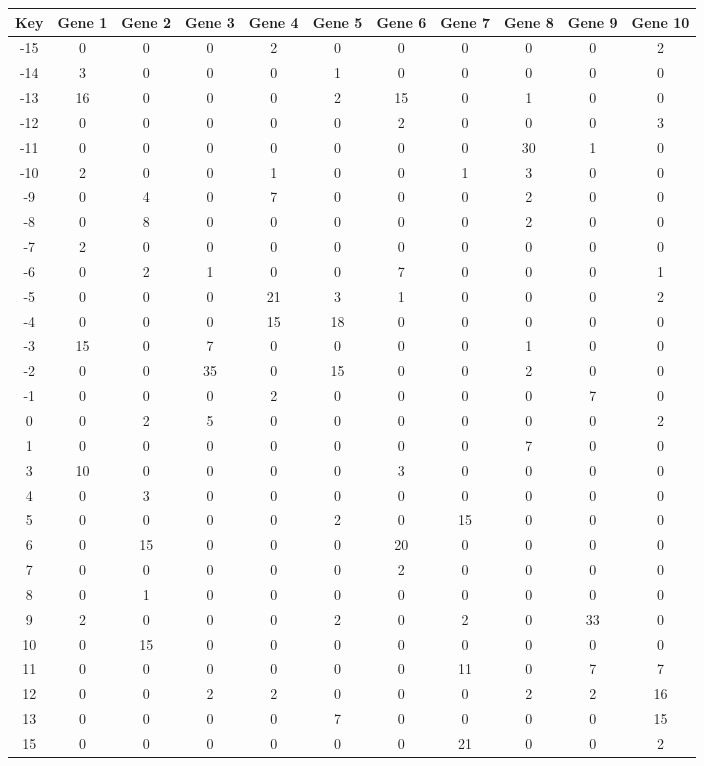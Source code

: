 \begin{tabular}{|c|c|c|c|c|c|c|c|c|c|c|}
\hline
Key & Gene 1 & Gene 2 & Gene 3 & Gene 4 & Gene 5 & Gene 6 & Gene 7 & Gene 8 & Gene 9 & Gene 10 \\
\hline
-15 & 0 & 0 & 0 & 2 & 0 & 0 & 0 & 0 & 0 & 2 \\
-14 & 3 & 0 & 0 & 0 & 1 & 0 & 0 & 0 & 0 & 0 \\
-13 & 16 & 0 & 0 & 0 & 2 & 15 & 0 & 1 & 0 & 0 \\
-12 & 0 & 0 & 0 & 0 & 0 & 2 & 0 & 0 & 0 & 3 \\
-11 & 0 & 0 & 0 & 0 & 0 & 0 & 0 & 30 & 1 & 0 \\
-10 & 2 & 0 & 0 & 1 & 0 & 0 & 1 & 3 & 0 & 0 \\
-9 & 0 & 4 & 0 & 7 & 0 & 0 & 0 & 2 & 0 & 0 \\
-8 & 0 & 8 & 0 & 0 & 0 & 0 & 0 & 2 & 0 & 0 \\
-7 & 2 & 0 & 0 & 0 & 0 & 0 & 0 & 0 & 0 & 0 \\
-6 & 0 & 2 & 1 & 0 & 0 & 7 & 0 & 0 & 0 & 1 \\
-5 & 0 & 0 & 0 & 21 & 3 & 1 & 0 & 0 & 0 & 2 \\
-4 & 0 & 0 & 0 & 15 & 18 & 0 & 0 & 0 & 0 & 0 \\
-3 & 15 & 0 & 7 & 0 & 0 & 0 & 0 & 1 & 0 & 0 \\
-2 & 0 & 0 & 35 & 0 & 15 & 0 & 0 & 2 & 0 & 0 \\
-1 & 0 & 0 & 0 & 2 & 0 & 0 & 0 & 0 & 7 & 0 \\
0 & 0 & 2 & 5 & 0 & 0 & 0 & 0 & 0 & 0 & 2 \\
1 & 0 & 0 & 0 & 0 & 0 & 0 & 0 & 7 & 0 & 0 \\
3 & 10 & 0 & 0 & 0 & 0 & 3 & 0 & 0 & 0 & 0 \\
4 & 0 & 3 & 0 & 0 & 0 & 0 & 0 & 0 & 0 & 0 \\
5 & 0 & 0 & 0 & 0 & 2 & 0 & 15 & 0 & 0 & 0 \\
6 & 0 & 15 & 0 & 0 & 0 & 20 & 0 & 0 & 0 & 0 \\
7 & 0 & 0 & 0 & 0 & 0 & 2 & 0 & 0 & 0 & 0 \\
8 & 0 & 1 & 0 & 0 & 0 & 0 & 0 & 0 & 0 & 0 \\
9 & 2 & 0 & 0 & 0 & 2 & 0 & 2 & 0 & 33 & 0 \\
10 & 0 & 15 & 0 & 0 & 0 & 0 & 0 & 0 & 0 & 0 \\
11 & 0 & 0 & 0 & 0 & 0 & 0 & 11 & 0 & 7 & 7 \\
12 & 0 & 0 & 2 & 2 & 0 & 0 & 0 & 2 & 2 & 16 \\
13 & 0 & 0 & 0 & 0 & 7 & 0 & 0 & 0 & 0 & 15 \\
15 & 0 & 0 & 0 & 0 & 0 & 0 & 21 & 0 & 0 & 2 \\
\hline
\end{tabular}